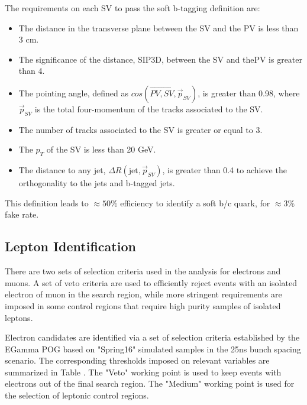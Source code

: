 The requirements on each SV to pass the soft b-tagging definition are:
\begin{itemize}
	 \item The distance in the transverse plane between the SV and the PV is less than 3 cm.
	 \item The significance of the distance, SIP3D, between the SV and thePV is greater than 4.
	 \item The pointing angle, defined as $cos(\overrightarrow{PV,SV},\overrightarrow{p}_{SV})$, is greater than 0.98, where $\overrightarrow{p}_{SV}$ is the total four-momentum of the tracks associated to the SV. 
	 \item The number of tracks associated to the SV is greater or equal to 3.
	 \item The $p_T$ of the SV is less than 20 GeV.
	 \item The distance to any jet, $\Delta R(\text{jet},\overrightarrow{p}_{SV})$, is greater than 0.4 to achieve the orthogonality to the jets and b-tagged jets.
 \end{itemize}
 
 This definition leads to $\approx 50 \%$ efficiency to identify a soft b/c quark, for $\approx3\%$ fake rate.
 
 \subsection{Lepton Identification}\label{EleMuonID}
 There are two sets of selection criteria used in the analysis for electrons and muons. A set of veto criteria are used to efficiently reject events with an isolated electron of muon in the search region, while more stringent requirements are imposed in some control regions that require high purity samples of isolated leptons.
 
 Electron candidates are identified via a set of selection criteria established by the EGamma POG based on "Spring16" simulated samples in the 25ns bunch spacing scenario. The corresponding thresholds imposed on relevant variables are summarized in Table . The "Veto" working point is used to keep events with electrons out of the final search region. The "Medium" working point is used for the selection of leptonic control regions. 
 
